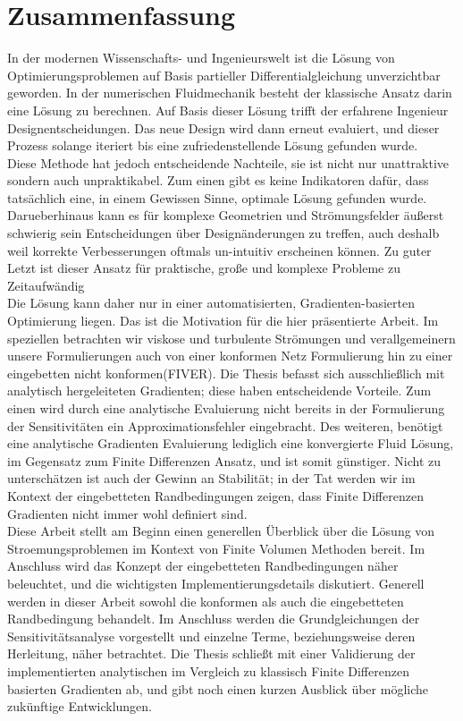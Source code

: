 \section*{Zusammenfassung}
In der modernen Wissenschafts- und Ingenieurswelt ist die Lösung von Optimierungsproblemen auf Basis partieller Differentialgleichung unverzichtbar geworden.
In der numerischen Fluidmechanik besteht der klassische Ansatz darin eine Lösung zu berechnen. Auf Basis dieser Lösung trifft der erfahrene Ingenieur Designentscheidungen. Das neue Design wird dann erneut evaluiert, und dieser Prozess solange iteriert bis eine zufriedenstellende L\"osung gefunden wurde.\\
Diese Methode hat jedoch entscheidende Nachteile, sie ist nicht nur unattraktive sondern auch unpraktikabel. Zum einen gibt es keine Indikatoren dafür, dass tats\"achlich eine, in einem Gewissen Sinne, optimale L\"osung gefunden wurde. Darueberhinaus kann es für komplexe Geometrien und Str\"omungsfelder \"außerst schwierig sein Entscheidungen über Design\"anderungen zu treffen, auch deshalb weil korrekte Verbesserungen oftmals un-intuitiv erscheinen k\"onnen. Zu guter Letzt ist dieser Ansatz für praktische, große und komplexe Probleme zu Zeitaufw\"andig\\
Die L\"osung kann daher nur in einer automatisierten, Gradienten-basierten Optimierung liegen. Das ist die Motivation f\"ur die hier pr\"asentierte Arbeit. Im speziellen betrachten wir viskose und turbulente Str\"omungen und verallgemeinern unsere Formulierungen auch von einer konformen Netz Formulierung hin zu einer eingebetten nicht konformen(FIVER). Die Thesis befasst sich ausschließlich mit analytisch hergeleiteten Gradienten; diese haben entscheidende Vorteile. Zum einen wird durch eine analytische Evaluierung nicht bereits in der Formulierung der Sensitivit\"aten ein Approximationsfehler eingebracht. Des weiteren, ben\"otigt eine analytische Gradienten Evaluierung lediglich eine konvergierte Fluid L\"osung, im Gegensatz zum Finite Differenzen Ansatz, und ist somit günstiger. Nicht zu untersch\"atzen ist auch der Gewinn an Stabilit\"at; in der Tat werden wir im Kontext der eingebetteten Randbedingungen zeigen, dass Finite Differenzen Gradienten nicht immer wohl definiert sind.\\
Diese Arbeit stellt am Beginn einen generellen Überblick über die L\"osung von Stroemungsproblemen im Kontext von Finite Volumen Methoden bereit. Im Anschluss wird das Konzept der eingebetteten Randbedingungen n\"aher beleuchtet, und die wichtigsten Implementierungsdetails diskutiert. Generell werden in dieser Arbeit sowohl die konformen als auch die eingebetteten Randbedingung behandelt. Im Anschluss werden die Grundgleichungen der Sensitivit\"atsanalyse vorgestellt und einzelne Terme, beziehungsweise deren Herleitung, n\"aher betrachtet. Die Thesis schließt mit einer Validierung der implementierten analytischen im Vergleich zu klassisch Finite Differenzen basierten Gradienten ab, und gibt noch einen kurzen Ausblick über m\"ogliche zukünftige Entwicklungen.

